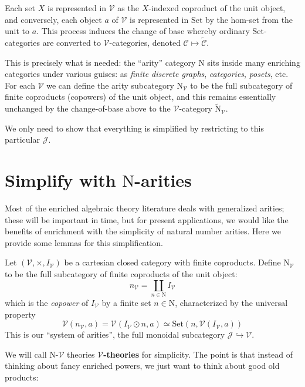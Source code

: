\documentclass[a4paper,UKenglish]{article}
\theoremstyle{definition}
\newcommand{\Set}{\mathrm{Set}}
\newcommand{\NN}{\mathrm{N}}
\newcommand{\V}{\mathscr{V}}
\newcommand{\C}{\mathscr{C}}
\newcommand{\J}{\mathscr{J}}
\begin{document}
Each set $X$ is represented in $\V$ as the $X$-indexed coproduct of the unit object, and conversely, each object $a$ of $\V$ is represented in $\Set$ by the hom-set from the unit to $a$. This process induces the change of base whereby ordinary $\Set$-categories are converted to $\V$-categories, denoted $\C \mapsto \tilde{\C}$.

This is precisely what is needed: the ``arity'' category $\NN$ sits inside many enriching categories under various guises: as \textit{finite discrete graphs}, \textit{categories}, \textit{posets}, etc. For each $\V$ we can define the arity subcategory $\NN_\V$ to be the full subcategory of finite coproducts (copowers) of the unit object, and this remains essentially unchanged by the change-of-base above to the $\V$-category $\tilde{\NN}_\V$.

We only need to show that everything is simplified by restricting to this particular $\J$.

\section{Simplify with $\NN$-arities}

Most of the enriched algebraic theory literature deals with generalized arities; these will be important in time, but for present applications, we would like the benefits of enrichment with the simplicity of natural number arities. Here we provide some lemmas for this simplification.

Let $(\V,\times,I_\V)$ be a cartesian closed category with finite coproducts. Define $\NN_\V$ to be the full subcategory of finite coproducts of the unit object: $$n_\V = \coprod_{n \in \NN} I_\V$$ which is the \textit{copower} of $I_\V$ by a finite set $n \in \NN$, characterized by the universal property $$\V(n_\V,a) = \V(I_\V \odot n,a) \simeq \Set(n,\V(I_\V,a))$$ This is our ``system of arities'', the full monoidal subcategory $\J \hookrightarrow \V$.

We will call $\NN$-$\V$ theories \textbf{$\V$-theories} for simplicity. The point is that instead of thinking about fancy enriched powers, we just want to think about good old products:
\end{document}
